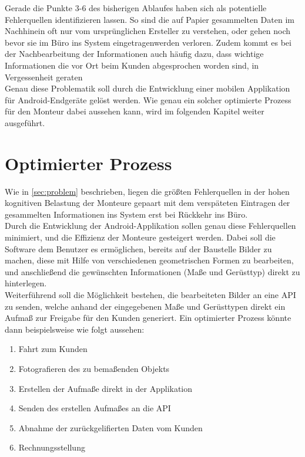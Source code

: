 Gerade die Punkte 3-6 des bisherigen Ablaufes haben sich als potentielle Fehlerquellen identifizieren lassen.
So sind die auf Papier gesammelten Daten im Nachhinein oft nur vom ursprünglichen Ersteller zu verstehen, oder gehen noch bevor sie im Büro ins System eingetragenwerden verloren.
Zudem kommt es bei der Nachbearbeitung der Informationen auch häufig dazu, dass wichtige Informationen die vor Ort beim Kunden abgesprochen worden sind, in Vergessenheit geraten  \\

Genau diese Problematik soll durch die Entwicklung einer mobilen Applikation für Android-Endgeräte gelöst werden.
Wie genau ein solcher optimierte Prozess für den Monteur dabei aussehen kann, wird im folgenden Kapitel weiter ausgeführt.

\section{Optimierter Prozess}
Wie in \autoref{sec:problem} beschrieben, liegen die größten Fehlerquellen in der hohen kognitiven Belastung der Monteure gepaart mit dem verspäteten Eintragen der gesammelten Informationen ins System erst bei Rückkehr ins Büro. \\

Durch die Entwicklung der Android-Applikation sollen genau diese Fehlerquellen minimiert, und die Effizienz der Monteure gesteigert werden.
Dabei soll die Software dem Benutzer es ermöglichen, bereits auf der Baustelle Bilder zu machen, diese mit Hilfe von verschiedenen geometrischen Formen zu bearbeiten, und anschließend die gewünschten Informationen (Maße und Gerüsttyp) direkt zu hinterlegen. \\

Weiterführend soll die Möglichkeit bestehen, die bearbeiteten Bilder an eine API  zu senden, welche anhand der eingegebenen Maße und Gerüsttypen direkt ein Aufmaß zur Freigabe für den Kunden generiert.
Ein optimierter Prozess könnte dann beispielsweise wie folgt aussehen:

\begin{enumerate}
	\item Fahrt zum Kunden
	\item Fotografieren des zu bemaßenden Objekts
  \item Erstellen der Aufmaße direkt in der Applikation
	\item Senden des erstellen Aufmaßes an die API
	\item Abnahme der zurückgelifierten Daten vom Kunden
	\item Rechnungsstellung
\end{enumerate} 

